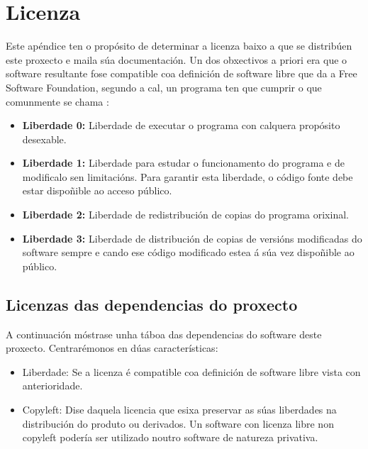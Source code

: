 \chapter[Apéndice]{
  \label{chp:dicionario}
  Licenza
}

Este apéndice ten o propósito de determinar a licenza baixo a que se distribúen este proxecto e maila súa documentación. Un dos obxectivos a priori era que o software resultante fose compatible coa definición de software libre que da a Free Software Foundation, segundo a cal, un programa ten que cumprir o que comunmente se chama \cite{licenza}:

\begin{itemize}
	\item \textbf{Liberdade 0:} Liberdade de executar o programa con calquera propósito desexable.
	\item \textbf{Liberdade 1:} Liberdade para estudar o funcionamento do programa e de modificalo sen limitacións. Para garantir esta liberdade, o código fonte debe estar dispoñible ao acceso público.
	\item \textbf{Liberdade 2:} Liberdade de redistribución de copias do programa orixinal. 
	\item \textbf{Liberdade 3:} Liberdade de distribución de copias de versións modificadas do software sempre e cando ese código modificado estea á súa vez dispoñible ao público.
\end{itemize} 

\section{Licenzas das dependencias do proxecto}

A continuación móstrase unha táboa das dependencias do software deste proxecto. Centrarémonos en dúas características:

\begin{itemize}
	\item Liberdade: Se a licenza é compatible coa definición de software libre vista con anterioridade.
	\item Copyleft: Dise daquela licencia que esixa preservar as súas liberdades na distribución do produto ou derivados. Un software con licenza libre non copyleft podería ser utilizado noutro software de natureza privativa.
\end{itemize} 
\break

